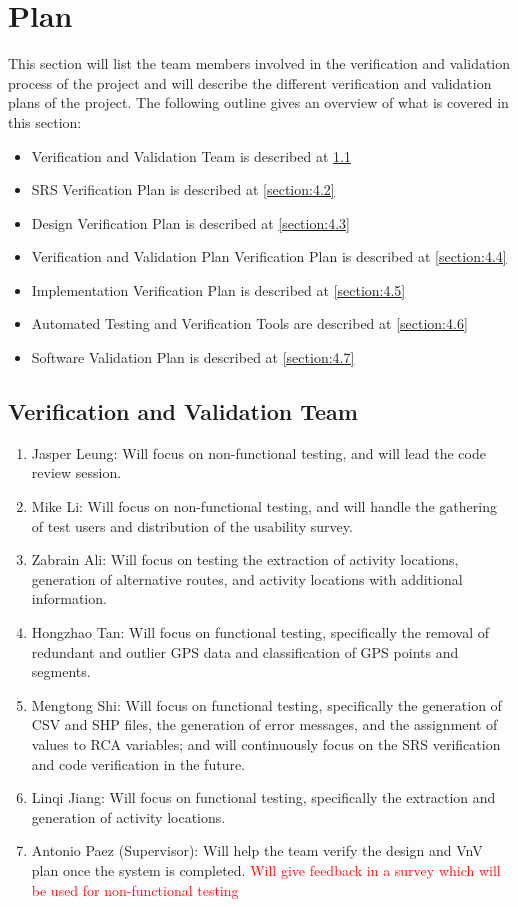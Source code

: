 \documentclass[12pt, titlepage]{article}
\begin{document}
\section{Plan}
\label{section:4}
This section will list the team members involved in the verification and validation process of the project and will describe the different verification and validation plans of the project. The following outline gives an overview of what is covered in this section:
\begin{itemize}
    \item Verification and Validation Team is described at \ref{section:4.1}
    \item SRS Verification Plan is described at \ref{section:4.2}
    \item Design Verification Plan is described at \ref{section:4.3}
    \item Verification and Validation Plan Verification Plan is described at \ref{section:4.4}
    \item Implementation Verification Plan is described at \ref{section:4.5}
    \item Automated Testing and Verification Tools are described at \ref{section:4.6}
    \item Software Validation Plan is described at \ref{section:4.7}
\end{itemize}

\subsection{Verification and Validation Team}
\label{section:4.1}
\begin{enumerate}
  \item Jasper Leung: Will focus on non-functional testing, and will lead the code review session.
  \item Mike Li: Will focus on non-functional testing, and will handle the gathering of test users and distribution of the usability survey.
  \item Zabrain Ali: Will focus on testing the extraction of activity locations, generation of alternative routes, and activity locations with additional information.
  \item Hongzhao Tan: Will focus on functional testing, specifically the removal of redundant and outlier GPS data and classification of GPS points and segments.
  \item Mengtong Shi: Will focus on functional testing, specifically the generation of CSV and SHP files, the generation of error messages, and the assignment of values to RCA variables; and will continuously focus on the SRS verification and code verification in the future.
  \item Linqi Jiang: Will focus on functional testing, specifically the extraction and generation of activity locations.
  \item Antonio Paez (Supervisor): Will help the team verify the design and VnV plan once the system is completed. \textcolor{red}{Will give feedback in a survey which will be used for non-functional testing}
\end{enumerate}
\end{document}
